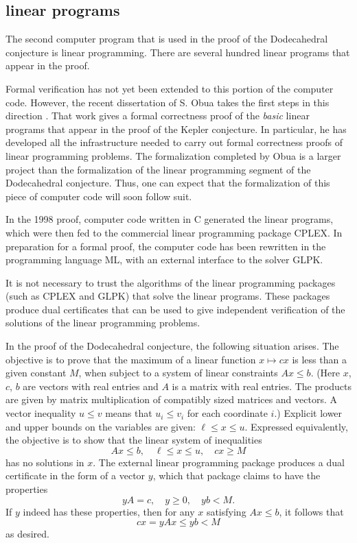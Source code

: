 
\subsection{linear programs}

The second computer 
program that is used in the proof of the Dodecahedral
conjecture is linear programming.  There are several hundred
linear programs that appear in the proof.

Formal verification has not yet been extended to this portion
of the computer code.  However, the recent dissertation of
S. Obua takes the first steps in this direction \cite{Ob}.
That work gives a formal correctness proof of the {\it basic} linear
programs that appear in the proof of the Kepler conjecture.
In particular, he has developed all the infrastructure needed to
carry out formal correctness proofs of linear programming problems.
The formalization  completed by Obua is a larger project than the
formalization of the linear programming segment of the Dodecahedral
conjecture.
Thus, one can expect that the formalization of this piece of
computer code  will soon follow suit.

In the 1998 proof, computer code written in C  generated 
the linear programs, which were then fed to the 
commercial linear programming
package CPLEX.  In preparation for a formal proof, the computer
code has been rewritten in the programming language ML, with
an external interface to the solver GLPK.

It is not necessary to trust the algorithms of the
linear programming packages (such as CPLEX and GLPK) that solve
the linear programs.  These packages produce dual certificates that
can be used to give independent verification of the solutions
of the linear programming problems.

In the proof of the Dodecahedral conjecture,   the
following situation arises.  The objective is 
to prove that the maximum of a
linear function 
$x\mapsto c x$ is less than a given constant $M$, when subject
to a system of linear constraints $A x \le b$.  (Here $x$, $c$, $b$
are vectors with real entries and $A$ is a matrix with real
entries.  The products are given by matrix multiplication of compatibly sized matrices and vectors. 
A vector inequality $u\le v$
means that $u_i \le v_i$ for each coordinate $i$.) 
Explicit lower and upper bounds on the variables
are given: $\ell \le x \le u$.
Expressed equivalently, the objective is to show that the linear 
system of inequalities
  $$
  A x \le b,\quad \ell \le x\le u,\quad c x \ge M
  $$
has no solutions in $x$.
The external linear programming package produces a dual certificate
in the form of a vector $y$, which that package claims to have
the properties 
  \begin{equation}
  y A = c,\quad y\ge 0,\quad y b < M.
  \end{equation}
If $y$ indeed has these properties, then for any $x$ satisfying
$A x \le b$, it follows that
   \begin{equation}\label{eqn:cxM}
   c x = y A x \le y b < M
   \end{equation}
as desired.


